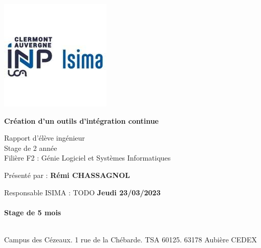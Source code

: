 \begin{titlepage}
  \includegraphics{img/logo_isima_inp.jpeg}
  \begin{center}
    \vspace*{1cm}

    \Huge
    \textbf{Création d'un outils d'intégration continue}

    \vspace{0.5cm}
    \LARGE
    Rapport d'élève ingénieur\\
    Stage de 2 année\\
    Filière F2 : Génie Logiciel et Systèmes Informatiques

    \vspace{1.5cm}

    Présenté par : \textbf{Rémi CHASSAGNOL}

    \vfill

    \vspace{0.5cm}
  \end{center}


  \large
  \noindent
  Responsable ISIMA : TODO \hfill \textbf{Jeudi 23/03/2023}\\~\\
  \raggedleft \textbf{Stage de 5 mois}\\~\\
  \raggedright
  Campus des Cézeaux. 1 rue de la Chébarde. TSA 60125. 63178 Aubière CEDEX\\
\end{titlepage}
